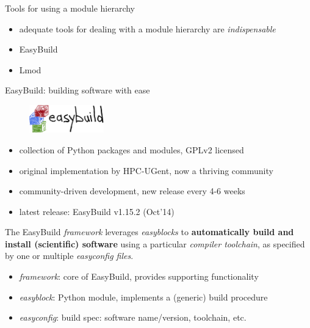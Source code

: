 \documentclass[10pt,xcolor={usenames,dvipsnames}]{beamer}
\begin{document}

\begin{frame}{Tools for using a module hierarchy}
    \begin{itemize}
        \item adequate tools for dealing with a module hierarchy are \emph{indispensable}
        \item EasyBuild
        \item Lmod
    \end{itemize}
\end{frame}


\begin{frame}{EasyBuild: building software with ease}
    \begin{figure}[centering]
        \includegraphics[height=1.2cm]{easybuild_logo.jpg}
    \end{figure}
    \begin{itemize}
        \item collection of Python packages and modules, GPLv2 licensed
        \item original implementation by HPC-UGent, now a thriving community
        \item community-driven development, new release every 4-6 weeks
        \item latest release: EasyBuild v1.15.2 (Oct'14)
    \end{itemize}

    The EasyBuild \emph{framework} leverages \emph{easyblocks} to \textbf{automatically
    build and install (scientific) software} using a particular \emph{compiler toolchain},
    as specified by one or multiple \emph{easyconfig files}.

    \begin{itemize}
        \item \emph{framework}: core of EasyBuild, provides supporting functionality
        \item \emph{easyblock}: Python module, implements a (generic) build procedure
        \item \emph{easyconfig}: build spec: software name/version, toolchain, etc.
    \end{itemize}
\end{frame}
\end{document}
